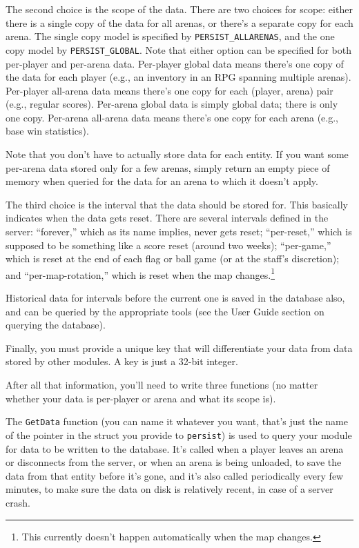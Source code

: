 \documentclass{article}
\begin{document}
The second choice is the scope of the data. There are two choices for
scope: either there is a single copy of the data for all arenas, or
there's a separate copy for each arena. The single copy model is
specified by \verb/PERSIST_ALLARENAS/, and the one copy model by
\verb/PERSIST_GLOBAL/. Note that either option can be specified for both
per-player and per-arena data. Per-player global data means there's one
copy of the data for each player (e.g., an inventory in an RPG spanning
multiple arenas). Per-player all-arena data means there's one copy for
each (player, arena) pair (e.g., regular scores). Per-arena global data
is simply global data; there is only one copy. Per-arena all-arena data
means there's one copy for each arena (e.g., base win statistics).

Note that you don't have to actually store data for each entity. If you
want some per-arena data stored only for a few arenas, simply return an
empty piece of memory when queried for the data for an arena to which it
doesn't apply.

The third choice is the interval that the data should be stored for.
This basically indicates when the data gets reset. There are several
intervals defined in the server: ``forever,'' which as its name implies,
never gets reset; ``per-reset,'' which is supposed to be something like
a score reset (around two weeks); ``per-game,'' which is reset at the
end of each flag or ball game (or at the staff's discretion); and
``per-map-rotation,'' which is reset when the map changes.\footnote{This
currently doesn't happen automatically when the map changes.}

Historical data for intervals before the current one is saved in the
database also, and can be queried by the appropriate tools (see the User
Guide section on querying the database).

Finally, you must provide a unique key that will differentiate your data
from data stored by other modules. A key is just a 32-bit integer.

After all that information, you'll need to write three functions (no
matter whether your data is per-player or arena and what its scope is).

The \verb/GetData/ function (you can name it whatever you want, that's
just the name of the pointer in the struct you provide to
\verb/persist/) is used to query your module for data to be written to
the database. It's called when a player leaves an arena or disconnects
from the server, or when an arena is being unloaded, to save the data
from that entity before it's gone, and it's also called periodically
every few minutes, to make sure the data on disk is relatively recent,
in case of a server crash.
\end{document}
